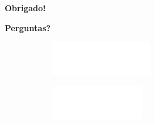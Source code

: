 \documentclass[aspectratio=169,t,xcolor=table]{beamer}
\begin{document}
\begin{frame}
    \centering
    \vspace{3cm}

    \textbf{\Huge Obrigado!}

    \vspace{1cm}

    \textbf{\Large Perguntas?}

    \vspace{3cm}
    \begin{figure}
        \centering
        \begin{subfigure}{0.2\textwidth}
            \centering
            \includegraphics[height=1.5cm]{lib/logos/infw.png}
        \end{subfigure}%
        \qquad
        \begin{subfigure}{0.2\textwidth}
            \centering
            \includegraphics[height=1.5cm]{lib/logos/ufgw.png}
        \end{subfigure}
    \end{figure}
\end{frame}
\end{document}
